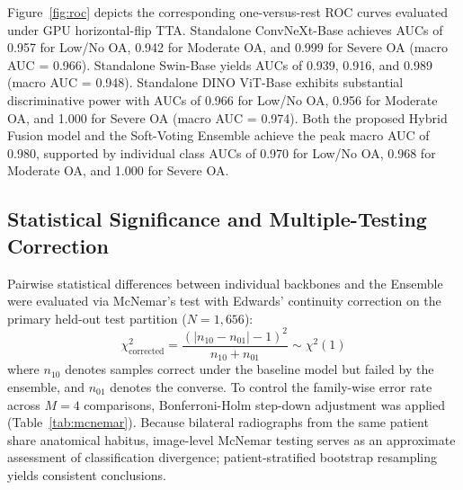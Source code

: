 \documentclass[10pt,journal]{IEEEtran}
\begin{document}
Figure~\ref{fig:roc} depicts the corresponding one-versus-rest ROC curves evaluated under GPU horizontal-flip TTA. Standalone ConvNeXt-Base achieves AUCs of 0.957 for Low/No OA, 0.942 for Moderate OA, and 0.999 for Severe OA (macro AUC = 0.966). Standalone Swin-Base yields AUCs of 0.939, 0.916, and 0.989 (macro AUC = 0.948). Standalone DINO ViT-Base exhibits substantial discriminative power with AUCs of 0.966 for Low/No OA, 0.956 for Moderate OA, and 1.000 for Severe OA (macro AUC = 0.974). Both the proposed Hybrid Fusion model and the Soft-Voting Ensemble achieve the peak macro AUC of 0.980, supported by individual class AUCs of 0.970 for Low/No OA, 0.968 for Moderate OA, and 1.000 for Severe OA.

\subsection{Statistical Significance and Multiple-Testing Correction}
\label{subsec:stats_sig}

Pairwise statistical differences between individual backbones and the Ensemble were evaluated via McNemar's test with Edwards' continuity correction on the primary held-out test partition ($N = 1{,}656$):
\begin{equation}
\chi_{\text{corrected}}^2 = \frac{\left( |n_{10} - n_{01}| - 1 \right)^2}{n_{10} + n_{01}} \sim \chi^2(1)
\label{eq:mcnemar_stat}
\end{equation}
where $n_{10}$ denotes samples correct under the baseline model but failed by the ensemble, and $n_{01}$ denotes the converse. To control the family-wise error rate across $M = 4$ comparisons, Bonferroni-Holm step-down adjustment was applied (Table~\ref{tab:mcnemar}). Because bilateral radiographs from the same patient share anatomical habitus, image-level McNemar testing serves as an approximate assessment of classification divergence; patient-stratified bootstrap resampling yields consistent conclusions.
\end{document}
